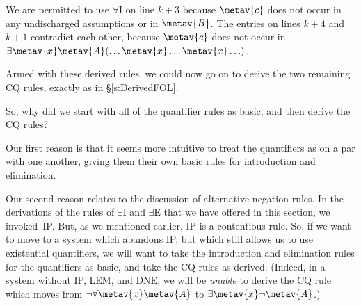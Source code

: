 \begin{fitchproof}
	\open
	\close
	\open
	\close
\end{fitchproof}\noindent
We are permitted to use $\forall$I on line $k+3$ because $\metav{c}$ does not occur in any  undischarged assumptions or in $\metav{B}$. The entries on lines $k+4$ and $k+1$ contradict each other, because $\metav{c}$ does not occur in $\exists \metav{x} \metav{A}(\ldots \metav{x} \ldots \metav{x} \ldots)$.

Armed with these derived rules, we could now go on to derive the two remaining CQ rules, exactly as in \S\ref{s:DerivedFOL}.

So, why did we start with all of the quantifier rules as basic, and then derive the CQ rules? 

Our first reason is that it seems more intuitive to treat the quantifiers as on a par with one another, giving them their own basic rules for introduction and elimination.

Our second reason relates to the discussion of alternative negation rules. In the derivations of the rules of $\exists$I and $\exists$E that we have offered in this section, we invoked~IP.  But, as we mentioned earlier, IP is a contentious rule. So, if we want to move to a system which abandons IP, but which still allows us to use existential quantifiers, we will want to take the introduction and elimination rules for the quantifiers as basic, and take the CQ rules as derived. (Indeed, in a system without IP, LEM, and DNE, we will be \emph{unable} to derive the CQ rule which moves from $\enot \forall \metav{x} \metav{A}$ to $\exists \metav{x} \enot \metav{A}$.)
